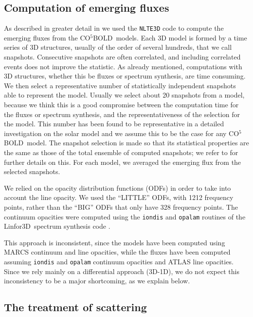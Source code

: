 \documentclass[]{aa}
\newcommand{\cobold}{{\sf CO$^5$BOLD}}
\newcommand{\linfor}{Linfor3D}
\begin{document}
  

\subsection{Computation of emerging fluxes}

As described in greater detail in \citet{Bonifacio_Mem}
we used the {\tt NLTE3D} code to compute the emerging
fluxes from the \cobold\ models. 
Each 3D model is formed by a time series of 3D structures, usually of the order of several hundreds, that we call snapshots.
Consecutive snapshots are often correlated, and including correlated events does not improve the  statistic.
As already mentioned, computations with 3D structures, whether this be
fluxes or spectrum synthesis,  are time consuming.
We then  select a representative number of statistically independent snapshots able to represent the model.
Usually we select about 20 snapshots from a model, because we think this is a good compromise between the computation time for the fluxes or spectrum synthesis, 
and the representativeness of the selection for the model. 
This number has been found to be representative in a detailed
investigation on the solar model
\citep{tesidetta} and we assume this to be the case for any \cobold\ model.
The snapshot selection is made so that its statistical
properties are the same as those of the total ensemble
of computed snapshots; we refer to \citet{CL07} for 
further details on this. 
For each model, 
we averaged the emerging flux from the selected snapshots.

We relied
on the \citet{CK03} opacity distribution functions (ODFs) in 
order to take into account the line opacity. 
We used the ``LITTLE'' 
ODFs, with 1212 frequency points, rather than the ``BIG'' 
ODFs that only have 328 frequency points.
The continuum opacities 
were computed using the {\tt iondis} and {\tt opalam} 
routines of the \linfor\ spectrum synthesis code \citep{Steffen2017,Gal17}.

This approach is inconsistent, since the models have been
computed using MARCS continuum and line opacities,
while the fluxes have been computed assuming  {\tt iondis} and {\tt opalam}
continuum opacities and ATLAS line opacities. Since
we rely mainly on a differential approach (3D-1D),  we do 
not expect this inconsistency to be a major shortcoming, as we explain below.

\subsection{The treatment of scattering}
\end{document}
